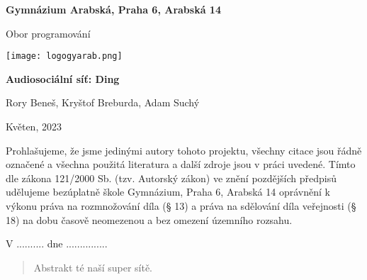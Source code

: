 
\begin{titlepage}
\begin{center}
\large \vspace*{\fill}
\thispagestyle{empty}

\LARGE

{ \huge \textbf{Gymnázium Arabská, Praha 6, Arabská 14}}

{\LARGE Obor programování }

\vfill
\texttt{[image: logogyarab.png]}
\vspace{15pt}

\vfill

{\huge \textbf{Audiosociální síť: Ding}}

\vfill

Rory Beneš, Kryštof Breburda, Adam Suchý

\vfill

{\large Květen, 2023}

\vspace*{\fill}
\end{center}
\end{titlepage}

\thispagestyle{empty}
\addtocounter{page}{-1}
\vspace*{\fill}
Prohlašujeme, že jsme jedinými autory tohoto projektu, všechny citace jsou řádně označené a všechna 
použitá literatura a další zdroje jsou v práci uvedené. Tímto dle zákona 121/2000 Sb. (tzv. Autorský zákon) 
ve znění pozdějších předpisů udělujeme bezúplatně škole Gymnázium, Praha 6, Arabská 14 oprávnění k výkonu 
práva na rozmnožování díla (§ 13) a práva na sdělování díla veřejnosti (§ 18) na dobu časově neomezenou a 
bez omezení územního rozsahu.

\vspace{2cm}
V .......... dne ...............


\vspace{2cm}


\vspace{2cm}


\vspace{2cm}

\newpage
\begin{abstract}
	Abstrakt té naší super sítě.
\end{abstract}

\tableofcontents
